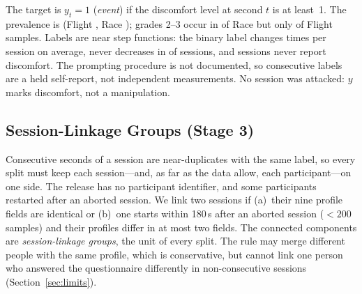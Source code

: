 The target is $y_t=1$ (\emph{event}) if the discomfort level at second $t$ is at least~1. The prevalence is \prevEval{} (Flight \prevFlight{}, Race \prevRace{}); grades 2--3 occur in \PHGradeRaceSevere{} of \PHGradeRaceSamples{} Race but only \PHGradeFlightSevere{} of \PHGradeFlightSamples{} Flight samples. Labels are near step functions: the binary label changes \PHLabelBinaryChanges{} times per session on average, never decreases in \PHLabelNonDecreasing{} of \PHLabelSessions{} sessions, and \nEventFreeSessions{} sessions never report discomfort. The prompting procedure is not documented, so consecutive labels are a held self-report, not independent measurements. No session was attacked: $y$ marks discomfort, not a manipulation.

\subsection{Session-Linkage Groups (Stage 3)}
\label{sec:groups}
Consecutive seconds of a session are near-duplicates with the same label, so every split must keep each session---and, as far as the data allow, each participant---on one side. The release has no participant identifier, and some participants restarted after an aborted session. We link two sessions if (a)~their nine profile fields are identical or (b)~one starts within 180\,s after an aborted session ($<200$ samples) and their profiles differ in at most two fields. The connected components are \nGroupsEval{} \emph{session-linkage groups}, the unit of every split. The rule may merge different people with the same profile, which is conservative, but cannot link one person who answered the questionnaire differently in non-consecutive sessions (Section~\ref{sec:limits}).

